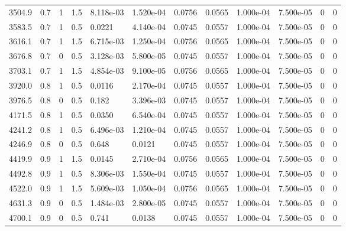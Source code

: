 \documentclass[preview]{standalone}
\begin{document}
{{\begin{tabular}{L{1.2cm}C{1.2cm} C{0.3cm}C{0.5cm} C{1.4cm}C{1.4cm} C{1.4cm}C{1.4cm} C{1.6cm}C{1.6cm} C{1.6cm}C{1.6cm}}
  3504.9  &   0.7  & 1     & 1.5 &  8.118e-03  & 1.520e-04  &  0.0756&   0.0565& 1.000e-04 & 7.500e-05   &  0 & 0  \\ 
  3583.5  &   0.7  & 1     & 0.5 &  0.0221  & 4.140e-04  &  0.0745&   0.0557& 1.000e-04 & 7.500e-05   &  0 & 0  \\ 
  3616.1  &   0.7  & 1     & 1.5 &  6.715e-03  & 1.250e-04  &  0.0756&   0.0565& 1.000e-04 & 7.500e-05   &  0 & 0  \\ 
  3676.8  &   0.7  & 0     & 0.5 &  3.128e-03  & 5.800e-05  &  0.0745&   0.0557& 1.000e-04 & 7.500e-05   &  0 & 0  \\ 
  3703.1  &   0.7  & 1     & 1.5 &  4.854e-03  & 9.100e-05  &  0.0756&   0.0565& 1.000e-04 & 7.500e-05   &  0 & 0  \\ 
  3920.0  &   0.8  & 1     & 0.5 &  0.0116  & 2.170e-04  &  0.0745&   0.0557& 1.000e-04 & 7.500e-05   &  0 & 0  \\ 
  3976.5  &   0.8  & 0     & 0.5 &  0.182  & 3.396e-03  &  0.0745&   0.0557& 1.000e-04 & 7.500e-05   &  0 & 0  \\ 
  4171.5  &   0.8  & 1     & 0.5 &  0.0350  & 6.540e-04  &  0.0745&   0.0557& 1.000e-04 & 7.500e-05   &  0 & 0  \\ 
  4241.2  &   0.8  & 1     & 0.5 &  6.496e-03  & 1.210e-04  &  0.0745&   0.0557& 1.000e-04 & 7.500e-05   &  0 & 0  \\ 
  4246.9  &   0.8  & 0     & 0.5 &  0.648  & 0.0121  &  0.0745&   0.0557& 1.000e-04 & 7.500e-05   &  0 & 0  \\ 
  4419.9  &   0.9  & 1     & 1.5 &  0.0145  & 2.710e-04  &  0.0756&   0.0565& 1.000e-04 & 7.500e-05   &  0 & 0  \\ 
  4492.8  &   0.9  & 1     & 0.5 &  8.306e-03  & 1.550e-04  &  0.0745&   0.0557& 1.000e-04 & 7.500e-05   &  0 & 0  \\ 
  4522.0  &   0.9  & 1     & 1.5 &  5.609e-03  & 1.050e-04  &  0.0756&   0.0565& 1.000e-04 & 7.500e-05   &  0 & 0  \\ 
  4631.3  &   0.9  & 0     & 0.5 &  1.484e-03  & 2.800e-05  &  0.0745&   0.0557& 1.000e-04 & 7.500e-05   &  0 & 0  \\ 
  4700.1  &   0.9  & 0     & 0.5 &  0.741  & 0.0138  &  0.0745&   0.0557& 1.000e-04 & 7.500e-05   &  0 & 0  \\ 
\hline 
\end{tabular} 

}}
\end{document}
